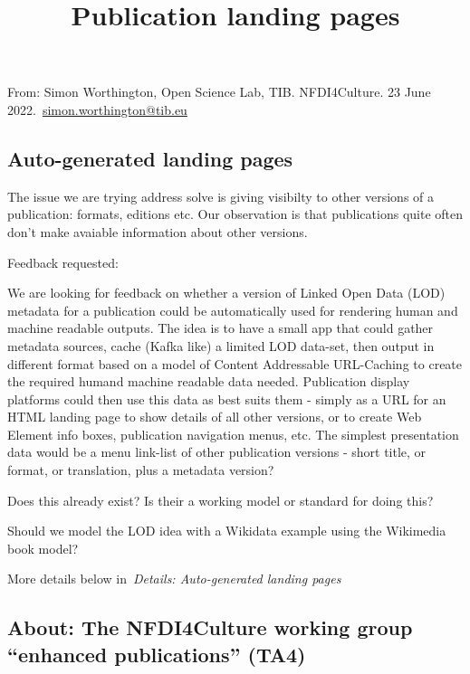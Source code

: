 \documentclass{article}
\begin{document}
\title{Publication landing pages}

\maketitle


From: Simon Worthington, Open Science Lab, TIB. NFDI4Culture. 23 June 2022. \href{mailto:simon.worthington@tib.eu}{simon.worthington@tib.eu}


\subsection{\textbf{Auto-generated landing pages}}\label{H5756141}



The issue we are trying address solve is giving visibilty to other versions of a publication: formats, editions etc. Our observation is that publications quite often don't make avaiable information about other versions.


Feedback requested:


We are looking for feedback on whether a version of Linked Open Data (LOD) metadata for a publication could be automatically used for rendering human and machine readable outputs. The idea is to have a small app that could gather metadata sources, cache (Kafka like) a limited LOD data-set, then output in different format based on a model of Content Addressable URL-Caching to create the required humand machine readable data needed. Publication display platforms could then use this data as best suits them - simply as a URL for an HTML landing page to show details of all other versions, or to create Web Element info boxes, publication navigation menus, etc. The simplest presentation data would be a menu link-list of other publication versions - short title, or format, or translation, plus a metadata version?


Does this already exist? Is their a working model or standard for doing this?


Should we model the LOD idea with a Wikidata example using the Wikimedia book model?


More details below in \emph{Details: Auto-generated landing pages}


\subsection{\textbf{About: The NFDI4Culture working group “enhanced publications” (TA4)}}\label{H6474399}
\end{document}
